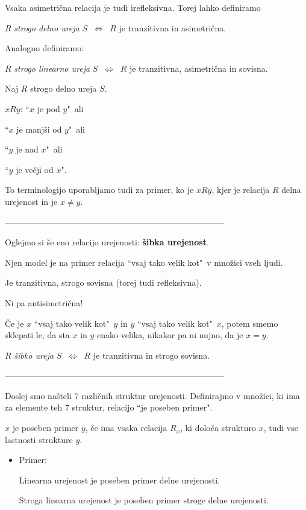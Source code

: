 \documentclass[11pt,paper=b5,DIV=13,headinclude,footinclude]{scrbook}
\def\cee {{~\Leftrightarrow~}}
\begin{document}
Vsaka asimetrična relacija je tudi irefleksivna. Torej lahko definiramo

$R$ {\em strogo delno ureja} $S$ $\cee$ $R$ je tranzitivna in asimetrična.

\bigskip

Analogno definiramo:

\medskip
$R$ {\em strogo linearno ureja} $S$ $\cee$ $R$ je tranzitivna, asimetrična in sovisna.

\bigskip

Naj $R$ strogo delno ureja $S$.

$xRy$: ``$x$ je pod  $y$"~ali

``$x$ je manjši od $y$"~ali

``$y$ je nad $x$"~ali

``$y$ je večji od  $x$".


\medskip
To terminologijo uporabljamo tudi za primer, ko je $xRy$, kjer je relacija $R$ delna urejenost in je $x\neq y$.

------------------------------------------------------------------------------

\bigskip

Oglejmo si še eno relacijo urejenosti: \textbf{ šibka urejenost}.

Njen model je na primer relacija ``vsaj tako velik kot"~v množici vseh ljudi.

Je tranzitivna, strogo sovisna (torej tudi refleksivna).

Ni pa antisimetrična!

Če je $x$ ``vsaj tako velik kot"~$y$ in $y$ ``vsaj tako velik kot"~$x$,
potem smemo sklepati le, da sta $x$ in $y$ enako velika, nikakor pa ni nujno, da je $x = y$.

$R$ {\em šibko ureja} $S$ $\cee$ $R$ je tranzitivna in strogo sovisna.

\bigskip

------------------------------------------------------------------------------
\bigskip

Doslej smo našteli $7$ različnih struktur urejenosti.
Definirajmo v množici, ki ima za elemente teh $7$ struktur, relacijo ``je poseben primer".

$x$ je poseben primer $y$, če ima vsaka relacija $R_x$, ki določa strukturo $x$, tudi vse lastnosti strukture $y$.

\begin{itemize}
  \item Primer:

  Linearna urejenost je poseben primer delne urejenosti.

Stroga linearna urejenost je poseben primer stroge delne urejenosti.
\end{itemize}
\end{document}
